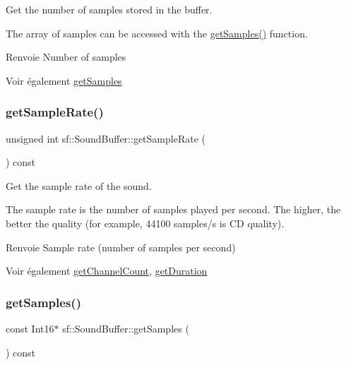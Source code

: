 Get the number of samples stored in the buffer. 

The array of samples can be accessed with the \hyperlink{classsf_1_1SoundBuffer_ab9b2525a8da64cb266ba728aff7adecb}{get\+Samples()} function.

\begin{DoxyReturn}{Renvoie}
Number of samples
\end{DoxyReturn}
\begin{DoxySeeAlso}{Voir également}
\hyperlink{classsf_1_1SoundBuffer_ab9b2525a8da64cb266ba728aff7adecb}{get\+Samples} 
\end{DoxySeeAlso}
\mbox{\label{classsf_1_1SoundBuffer_a2c2cf0078ce0549246ecc4a1646212b4}} 
\subsubsection{\texorpdfstring{get\+Sample\+Rate()}{getSampleRate()}}
{\footnotesize\ttfamily unsigned int sf\+::\+Sound\+Buffer\+::get\+Sample\+Rate (\begin{DoxyParamCaption}{ }\end{DoxyParamCaption}) const}



Get the sample rate of the sound. 

The sample rate is the number of samples played per second. The higher, the better the quality (for example, 44100 samples/s is CD quality).

\begin{DoxyReturn}{Renvoie}
Sample rate (number of samples per second)
\end{DoxyReturn}
\begin{DoxySeeAlso}{Voir également}
\hyperlink{classsf_1_1SoundBuffer_a127707b831d875ed790eef1aa2b9fcc3}{get\+Channel\+Count}, \hyperlink{classsf_1_1SoundBuffer_a280a581d9b360fd16121714c51fc8261}{get\+Duration} 
\end{DoxySeeAlso}
\mbox{\label{classsf_1_1SoundBuffer_ab9b2525a8da64cb266ba728aff7adecb}} 
\subsubsection{\texorpdfstring{get\+Samples()}{getSamples()}}
{\footnotesize\ttfamily const Int16$\ast$ sf\+::\+Sound\+Buffer\+::get\+Samples (\begin{DoxyParamCaption}{ }\end{DoxyParamCaption}) const}



